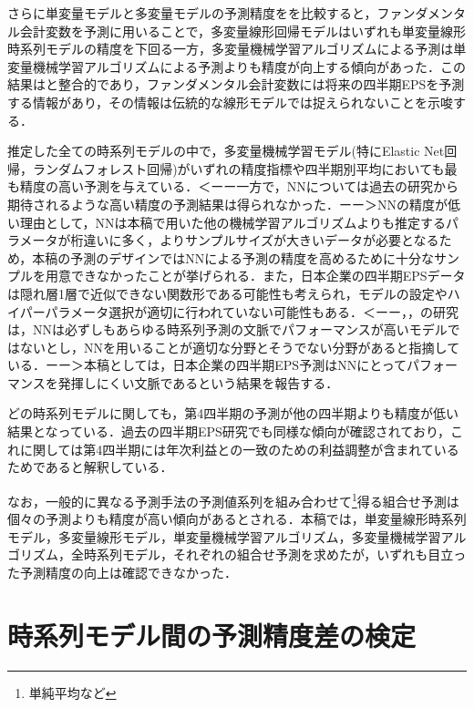 \documentclass[a4paper，12pt]{jsarticle}
\begin{document}
さらに単変量モデルと多変量モデルの予測精度をを比較すると，ファンダメンタル会計変数を予測に用いることで，多変量線形回帰モデルはいずれも単変量線形時系列モデルの精度を下回る一方，多変量機械学習アルゴリズムによる予測は単変量機械学習アルゴリズムによる予測よりも精度が向上する傾向があった．この結果は\cite{zhang2004neural}と整合的であり，ファンダメンタル会計変数には将来の四半期EPSを予測する情報があり，その情報は伝統的な線形モデルでは捉えられないことを示唆する．

推定した全ての時系列モデルの中で，多変量機械学習モデル(特にElastic Net回帰，ランダムフォレスト回帰)がいずれの精度指標や四半期別平均においても最も精度の高い予測を与えている．＜ーー一方で，NNについては過去の研究から期待されるような高い精度の予測結果は得られなかった．ーー＞NNの精度が低い理由として，NNは本稿で用いた他の機械学習アルゴリズムよりも推定するパラメータが桁違いに多く，よりサンプルサイズが大きいデータが必要となるため，本稿の予測のデザインではNNによる予測の精度を高めるために十分なサンプルを用意できなかったことが挙げられる．また，日本企業の四半期EPSデータは隠れ層1層で近似できない関数形である可能性も考えられ，モデルの設定やハイパーパラメータ選択が適切に行われていない可能性もある．＜ーー\cite{chatfield1993neural}，\cite{hill1994artificial}，\cite{callen1996neural}の研究は，NNは必ずしもあらゆる時系列予測の文脈でパフォーマンスが高いモデルではないとし，NNを用いることが適切な分野とそうでない分野があると指摘している．ーー＞本稿としては，日本企業の四半期EPS予測はNNにとってパフォーマンスを発揮しにくい文脈であるという結果を報告する．

どの時系列モデルに関しても，第4四半期の予測が他の四半期よりも精度が低い結果となっている．過去の四半期EPS研究でも同様な傾向が確認されており，これに関して\cite{sakurai1990}は第4四半期には年次利益との一致のための利益調整が含まれているためであると解釈している．

なお，一般的に異なる予測手法の予測値系列を組み合わせて\footnote{単純平均など}得る組合せ予測\citep*{bates1969combination}は個々の予測よりも精度が高い傾向があるとされる．本稿では，単変量線形時系列モデル，多変量線形モデル，単変量機械学習アルゴリズム，多変量機械学習アルゴリズム，全時系列モデル，それぞれの組合せ予測を求めたが，いずれも目立った予測精度の向上は確認できなかった．

\section{時系列モデル間の予測精度差の検定}
\end{document}
